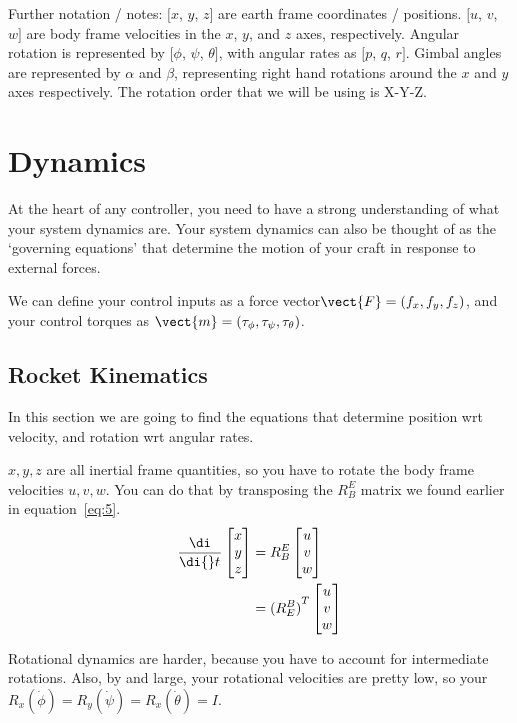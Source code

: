 \documentclass{article}
\newcommand{\diff}[1]{\frac{\di}{\di{}t_{#1}}}
\newcommand{\cvec}[1]{\begin{bmatrix}
    #1
\end{bmatrix}}
\begin{document}
Further notation / notes: $[x$, $y$, $z]$ are earth frame coordinates / positions. $[u$, $v$, $w]$ are body frame velocities in the $x$, $y$, and $z$ axes, respectively. Angular rotation is represented by $[\phi$, $\psi$, $\theta]$, with angular rates as $[p$, $q$, $r]$. Gimbal angles are represented by $\alpha$ and $\beta$, representing right hand rotations around the $x$ and $y$ axes respectively. The rotation order that we will be using is X{-}Y{-}Z. 

\section{Dynamics}

At the heart of any controller, you need to have a strong understanding of what your system dynamics are. Your system dynamics can also be thought of as the `governing equations' that determine the motion of your craft in response to external forces. 

We can define your control inputs as a force vector$\vect{F} = (f_x, f_y, f_z)$, and your control torques as $\vect{m} = (\tau_{\phi}, \tau_{\psi}, \tau_{\theta})$.

\subsection{Rocket Kinematics}
In this section we are going to find the equations that determine position wrt velocity, and rotation wrt angular rates.

$x, y, z$ are all inertial frame quantities, so you have to rotate the body frame velocities $u, v, w$. You can do that by transposing the $R^E_B$ matrix we found earlier in equation{~}\ref{eq:5}. 
\begin{equation}
    \begin{split}
        \diff{}\cvec{x\\y\\z}
        &= R^E_B \cvec{u\\v\\w}\\ 
        &={( R^B_E )}^T \cvec{u\\v\\w}
    \end{split}
\end{equation}

Rotational dynamics are harder, because you have to account for intermediate rotations. Also, by and large, your rotational velocities are pretty low, so your $R_x(\dot \phi)=R_y(\dot \psi)=R_x(\dot \theta) = I$.
\end{document}
